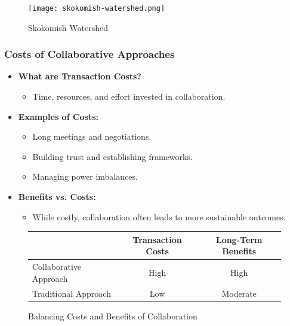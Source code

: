 \documentclass[10pt]{beamer}
\begin{document}
\begin{frame}
\begin{frame}
        \begin{figure}
            \centering
            \texttt{[image: skokomish-watershed.png]}
            \caption{Skokomish Watershed}
        \end{figure}
        \end{frame}
        
        \begin{frame}
        \frametitle{Costs of Collaborative Approaches}
        \begin{itemize}
            \item \textbf{What are Transaction Costs?}
                \begin{itemize}
                    \item Time, resources, and effort invested in collaboration.
                \end{itemize}
            \item \textbf{Examples of Costs:}
                \begin{itemize}
                    \item Long meetings and negotiations.
                    \item Building trust and establishing frameworks.
                    \item Managing power imbalances.
                \end{itemize}
            \item \textbf{Benefits vs. Costs:}
                \begin{itemize}
                    \item While costly, collaboration often leads to more sustainable outcomes.
                \end{itemize}
        \end{itemize}
        
        \begin{figure}
            \centering
            \begin{tabular}{lcc}
                \toprule
                & Transaction Costs & Long-Term Benefits \\
                \midrule
                Collaborative Approach & High & High \\
                Traditional Approach & Low & Moderate \\
                \bottomrule
            \end{tabular}
            \caption{Balancing Costs and Benefits of Collaboration}
        \end{figure}
        \end{frame}
        

\end{frame}
\end{document}
